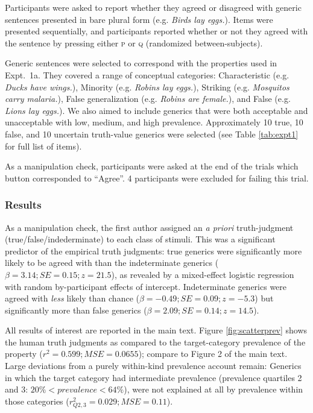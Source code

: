\documentclass[10pt,letterpaper]{article}
\begin{document}
Participants were asked to report whether they agreed or disagreed with generic sentences presented in bare plural form (e.g. \emph{Birds lay eggs.}). 
Items were presented sequentially, and participants reported whether or not they agreed with the sentence by pressing either \textsc{p} or \textsc{q} (randomized between-subjects). 

Generic sentences were selected to correspond with the properties used in Expt.~1a. 
They covered a range of conceptual categories: Characteristic (e.g. \emph{Ducks have wings.}), Minority (e.g. \emph{Robins lay eggs.}), Striking (e.g. \emph{Mosquitos carry malaria.}), False generalization (e.g. \emph{Robins are female.}), and False (e.g. \emph{Lions lay eggs.}).
We also aimed to include generics that were both acceptable and unacceptable with low, medium, and high prevalence.
Approximately 10 true, 10 false, and 10 uncertain truth-value generics were selected (see Table \ref{tab:expt1} for full list of items).

As a manipulation check, participants were asked at the end of the trials which button corresponded to ``Agree''. 4 participants were excluded for failing this trial.

\subsubsection{Results}

As a manipulation check, the first author assigned an \emph{a priori} truth-judgment (true/false/indederminate) to each class of stimuli. This was a significant predictor of the empirical truth judgments: true generics were significantly more likely to be agreed with than the indeterminate generics ($\beta = 3.14; SE = 0.15; z = 21.5$), as revealed by a mixed-effect logistic regression with random by-participant effects of intercept.
Indeterminate generics were agreed with \emph{less} likely than chance ($\beta = -0.49; SE = 0.09; z = -5.3$) but significantly more than false generics ($\beta = 2.09; SE = 0.14; z = 14.5$).


All results of interest are reported in the main text.
 Figure \ref{fig:scatterprev} shows the human truth judgments as compared to the target-category prevalence of the property ($r^2 = 0.599; MSE = 0.0655$); compare to Figure 2 of the main text.
 Large deviations from a purely within-kind prevalence account remain: 
 Generics in which the target category had intermediate prevalence (prevalence quartiles 2 and 3: $ 20\% < prevalence < 64\%$), were not explained at all by prevalence within those categories ($r_{Q2,3}^2 = 0.029; MSE = 0.11$).
\end{document}

